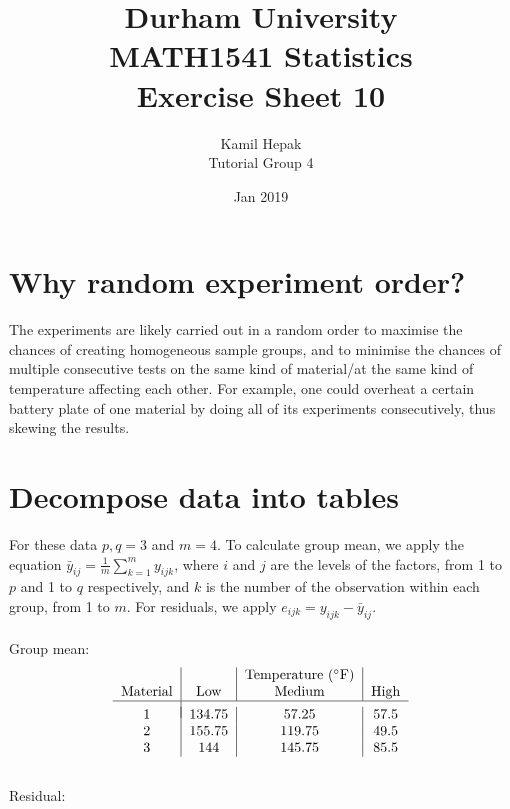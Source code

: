 \documentclass[]{article}
\title{\vspace{-3.0cm}Durham University\\
    MATH1541 Statistics \\
	Exercise Sheet 10}
\author{Kamil Hepak\\
        Tutorial Group 4}
\date{Jan 2019}
\begin{document}
\maketitle

\section{Why random experiment order?}
The experiments are likely carried out in a random order to maximise the chances of creating homogeneous sample groups, and to minimise the chances of multiple consecutive tests on the same kind of material/at the same kind of temperature affecting each other. For example, one could overheat a certain battery plate of one material by doing all of its experiments consecutively, thus skewing the results.

\section{Decompose data into tables}
For these data $p,q = 3$ and $m = 4$. To calculate group mean, we apply the equation $\bar{y}_{ij} = \frac{1}{m}\sum_{k=1}^{m}y_{ijk}$, where $i$ and $j$ are the levels of the factors, from 1 to $p$ and 1 to $q$ respectively, and $k$ is the number of the observation within each group, from 1 to $m$. For residuals, we apply $e_{ijk} = y_{ijk} - \bar{y}_{ij}.$\\
\\
Group mean:
\begin{displaymath}
    \begin{tabular}{c|c|c|c}
        &&Temperature ($^\circ$F)&\\
        Material&Low&Medium&High\\
        \hline\\
        [\dimexpr-\normalbaselineskip+4pt]
        1&134.75&57.25&57.5\\
        2&155.75&119.75&49.5\\
        3&144&145.75&85.5
    \end{tabular}
\end{displaymath}
\\
Residual:
\end{document}
